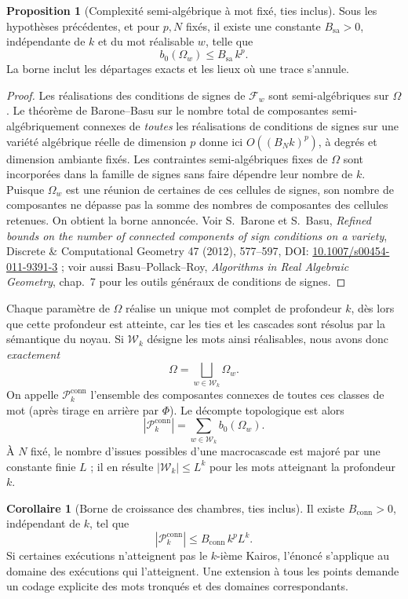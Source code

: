 \documentclass[11pt,a4paper]{article}
\theoremstyle{definition}
\newtheorem{propositionthm}[definition]{Proposition}
\newtheorem{corollary}[definition]{Corollaire}
\theoremstyle{remark}
\begin{document}
\begin{propositionthm}[Complexité semi-algébrique à mot fixé, ties inclus]
\label{prop:complexite-mot-fixe}
Sous les hypothèses précédentes, et pour $p,N$ fixés, il existe une constante $B_{\mathrm{sa}}>0$, indépendante de $k$ et du mot réalisable $w$, telle que
\[
 \boxed{b_0(\Omega_w)\le B_{\mathrm{sa}}\,k^p.}
\]
La borne inclut les départages exacts et les lieux où une trace s'annule.
\end{propositionthm}
\begin{proof}
Les réalisations des conditions de signes de $\mathscr F_w$ sont semi-algébriques sur $\Omega$. Le théorème de Barone--Basu sur le nombre total de composantes semi-algébriquement connexes de \emph{toutes} les réalisations de conditions de signes sur une variété algébrique réelle de dimension $p$ donne ici $O((B_Nk)^p)$, à degrés et dimension ambiante fixés. Les contraintes semi-algébriques fixes de $\Omega$ sont incorporées dans la famille de signes sans faire dépendre leur nombre de $k$. Puisque $\Omega_w$ est une réunion de certaines de ces cellules de signes, son nombre de composantes ne dépasse pas la somme des nombres de composantes des cellules retenues. On obtient la borne annoncée. Voir S.~Barone et S.~Basu, \emph{Refined bounds on the number of connected components of sign conditions on a variety}, Discrete \& Computational Geometry 47 (2012), 577--597, DOI: \href{https://doi.org/10.1007/s00454-011-9391-3}{10.1007/s00454-011-9391-3} ; voir aussi Basu--Pollack--Roy, \emph{Algorithms in Real Algebraic Geometry}, chap.~7 pour les outils généraux de conditions de signes.
\end{proof}

Chaque paramètre de $\Omega$ réalise un unique mot complet de profondeur $k$, dès lors que cette profondeur est atteinte, car les ties et les cascades sont résolus par la sémantique du noyau. Si $\mathcal W_k$ désigne les mots ainsi réalisables, nous avons donc \emph{exactement}
\[
 \boxed{\Omega=\bigsqcup_{w\in\mathcal W_k}\Omega_w.}
\]
On appelle $\mathcal P_k^{\mathrm{conn}}$ l'ensemble des composantes connexes de toutes ces classes de mot (après tirage en arrière par $\Phi$). Le décompte topologique est alors
\[
 \boxed{ |\mathcal P_k^{\mathrm{conn}}|=\sum_{w\in\mathcal W_k} b_0(\Omega_w).}
\]
À $N$ fixé, le nombre d'issues possibles d'une macrocascade est majoré par une constante finie $L$ ; il en résulte $|\mathcal W_k|\le L^k$ pour les mots atteignant la profondeur $k$.
\begin{corollary}[Borne de croissance des chambres, ties inclus]
\label{cor:borne-croissance-ties}
Il existe $B_{\mathrm{conn}}>0$, indépendant de $k$, tel que
\[
 \boxed{|\mathcal P_k^{\mathrm{conn}}|\le B_{\mathrm{conn}}\,k^pL^k.}
\]
Si certaines exécutions n'atteignent pas le $k$-ième Kairos, l'énoncé s'applique au domaine des exécutions qui l'atteignent. Une extension à tous les points demande un codage explicite des mots tronqués et des domaines correspondants.
\end{corollary}
\end{document}
